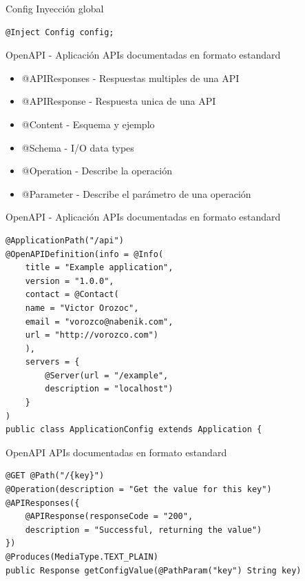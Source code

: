 \documentclass[aspectratio=169]{beamer}
\begin{document}
\begin{frame}[fragile]{Config}
Inyección global
\begin{lstlisting}
@Inject Config config;
\end{lstlisting}
\end{frame}

\begin{frame}[fragile]{OpenAPI - Aplicación}
APIs documentadas en formato estandard

\begin{itemize}
	\item @APIResponses - Respuestas multiples de una API
	\item @APIResponse - Respuesta unica de una API
	\item @Content - Esquema y ejemplo
	\item @Schema - I/O data types
	\item @Operation - Describe la operación
	\item @Parameter - Describe el parámetro de una operación
\end{itemize}

\end{frame}

\begin{frame}[fragile]{OpenAPI - Aplicación}
APIs documentadas en formato estandard
\begin{lstlisting}
@ApplicationPath("/api")
@OpenAPIDefinition(info = @Info(
	title = "Example application",
	version = "1.0.0",
	contact = @Contact(
	name = "Victor Orozoc",
	email = "vorozco@nabenik.com",
	url = "http://vorozco.com")
	),
	servers = {
		@Server(url = "/example",
		description = "localhost")
	}
)
public class ApplicationConfig extends Application {
\end{lstlisting}
\end{frame}

\begin{frame}[fragile]{OpenAPI}
APIs documentadas en formato estandard
\begin{lstlisting}
@GET @Path("/{key}")
@Operation(description = "Get the value for this key")
@APIResponses({
	@APIResponse(responseCode = "200",
	description = "Successful, returning the value")
})
@Produces(MediaType.TEXT_PLAIN)
public Response getConfigValue(@PathParam("key") String key)
\end{lstlisting}
\end{frame}
\end{document}
